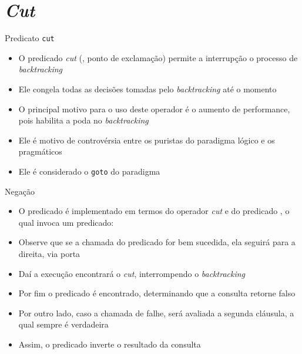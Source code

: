 \section{\it Cut}

\begin{frame}[fragile]{Predicato {\tt cut}}

    \begin{itemize}
        \item O predicado \textit{cut} (, ponto de exclamação) permite 
            a interrupção o processo de \textit{backtracking}

        \item Ele congela todas as decisões tomadas pelo \textit{backtracking} até o momento

        \item O principal motivo para o uso deste operador é o aumento de performance, pois
            habilita a poda no \textit{backtracking}

        \item Ele é motivo de controvérsia entre os puristas do paradigma lógico e os 
            pragmáticos

        \item Ele é considerado o \texttt{goto} do paradigma


    \end{itemize}

\end{frame}

\begin{frame}[fragile]{Negação}

    \begin{itemize}
        \item O predicado  é implementado em termos do operador 
            \textit{cut} e do predicado , o qual invoca um predicado:


        \item Observe que se a chamada do predicado  for bem sucedida, ela
            seguirá para a direita, via porta 

        \item Daí a execução encontrará o \textit{cut}, interrompendo o \textit{backtracking}

        \item Por fim o predicado  é encontrado, determinando que a 
            consulta retorne falso

        \item Por outro lado, caso a chamada de  falhe, será avaliada a 
            segunda cláusula, a qual sempre é verdadeira

        \item Assim, o predicado  inverte o resultado da consulta
    \end{itemize}

\end{frame}
